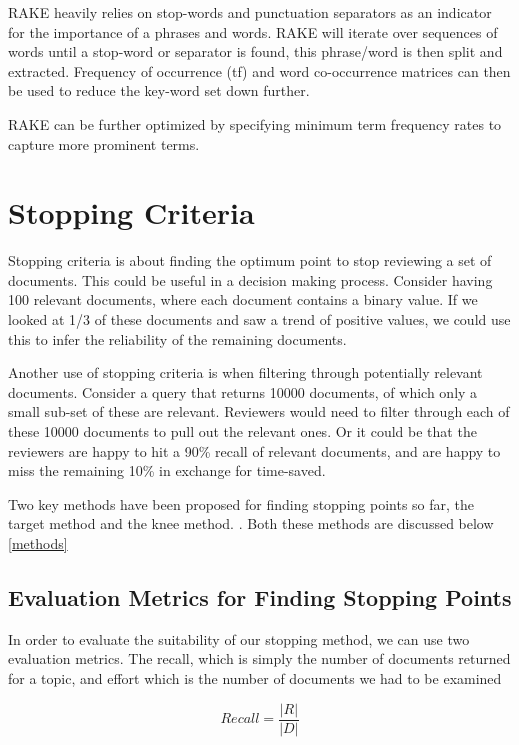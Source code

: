 RAKE heavily relies on stop-words and punctuation separators as an indicator for the importance of a phrases and words. RAKE will iterate over sequences of words until a stop-word or separator is found, this phrase/word is then split and extracted. Frequency of occurrence (tf) and word co-occurrence matrices can then be used to reduce the key-word set down further.

RAKE can be further optimized by specifying minimum term frequency rates to capture more prominent terms.


\section{Stopping Criteria} \label{stops}

Stopping criteria is about finding the optimum point to stop reviewing a set of documents. This could be useful in a decision making process. Consider having 100 relevant documents, where each document contains a binary value. If we looked at 1/3 of these documents and saw a trend of positive values, we could use this to infer the reliability of the remaining documents.

Another use of stopping criteria is when filtering through potentially relevant documents. Consider a query that returns 10000 documents, of which only a small sub-set of these are relevant. Reviewers would need to filter through each of these 10000 documents to pull out the relevant ones. Or it could be that the reviewers are happy to hit a 90\% recall of relevant documents, and are happy to miss the remaining 10\% in exchange for time-saved.

Two key methods have been proposed for finding stopping points so far, the target method \cite{Satopa11} and the knee method. \cite{Cormack2016}. Both these methods are discussed below \ref{methods}


\subsection{Evaluation Metrics for Finding Stopping Points} \label{evalsstops}

In order to evaluate the suitability of our stopping method, we can use two evaluation metrics. The recall, which is simply the number of documents returned for a topic, and effort which is the number of documents we had to be examined

\begin{equation}
Recall = \frac{|R|}{|D|}
\end{equation}

